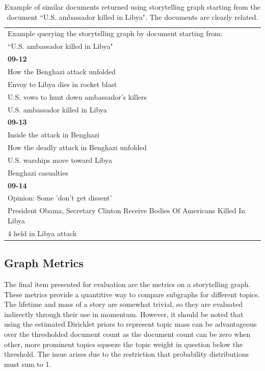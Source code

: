 \documentclass[10pt]{article}
\begin{document}
\begin{table}
\begin{center}
\begin{tabular}{|l|}
  \hline
  Example querying the storytelling graph by document starting from: \\
  \quad ``U.S. ambassador killed in Libya" \\
  \hline
\textbf{09-12} \\
\hline
How the Benghazi attack unfolded \\
Envoy to Libya dies in rocket blast \\
U.S. vows to hunt down ambassador's killers \\
U.S. ambassador killed in Libya \\
\hline
\textbf{09-13} \\ 
\hline
Inside the attack in Benghazi \\
How the deadly attack in Benghazi unfolded \\
U.S. warships move toward Libya \\
Benghazi casualties \\
\hline
\textbf{09-14}\\
\hline
Opinion: Some 'don't get dissent' \\
President Obama, Secretary Clinton Receive Bodies Of Americans Killed In Libya \\
4 held in Libya attack \\
\hline
\end{tabular}
\caption{Example of similar documents returned using storytelling graph starting from the document ``U.S. ambassador killed in Libya".  The documents are clearly related. }
\end{center}
\end{table} 

\subsection {Graph Metrics}

The final item presented for evaluation are the metrics on a storytelling graph.  These metrics provide a quantitive way to compare subgraphs for different topics. The lifetime and mass of a story are somewhat trivial, so they are evaluated indirectly through their use in momentum.  However, it should be noted that using the estimated Dirichlet priors to represent topic mass can be advantageous over the thresholded document count as the document count can be zero when other, more prominent topics squeeze the topic weight in question below the threshold.  The issue arises due to the restriction that probability distributions must sum to 1.
\end{document}

